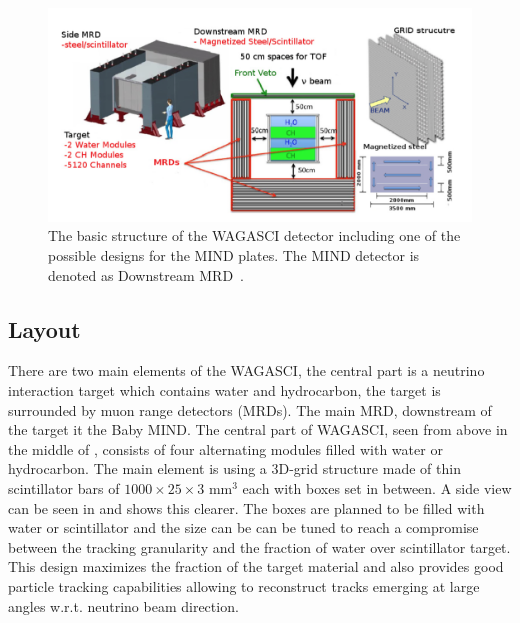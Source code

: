 
\begin{figure}[h!]
\centering
\includegraphics[width=\textwidth]{figures/WAGASCI.png}
\caption{The basic structure of the WAGASCI detector including one of the possible designs for the MIND plates. The MIND detector is denoted as Downstream MRD~\cite{30WAGASCI}.}
\label{fig:WAGASCI}
\end{figure}

\subsection{Layout}
There are two main elements of the WAGASCI, the central part is a neutrino interaction target which contains water and hydrocarbon, the target is surrounded by muon range detectors (MRDs). The main MRD, downstream of the target it the Baby MIND. The central part of WAGASCI, seen from above in the middle of , consists of four alternating modules filled with water or hydrocarbon. The main element is using a 3D-grid structure made of thin scintillator bars of $1000\times25\times3$ mm$^3$ each with boxes set in between. A side view can be seen in  and shows this clearer. The boxes are planned to be filled with water or scintillator and the size can be can be tuned to reach a compromise between the tracking granularity and the fraction of water over scintillator target. This design maximizes the fraction of the target material and also provides good particle tracking capabilities allowing to reconstruct tracks emerging at large angles w.r.t. neutrino beam direction.


